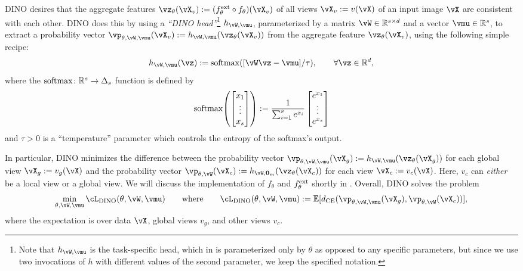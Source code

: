 \documentclass[\toplevelprefix/book-main.tex]{subfiles}
\begin{document}
DINO desires that the aggregate features \(\vz_{\theta}(\vX_{v}) := (f_{\theta}^{\ext} \circ f_{\theta})(\vX_{v})\) of all views \(\vX_{v} := v(\vX)\) of an input image \(\vX\) are consistent with each other. DINO does this by using a \textit{``DINO head''}\footnote{Note that \(h_{\vW, \vmu}\) is the task-specific head, which in  is parameterized only by \(\theta\) as opposed to any specific parameters, but since we use two invocations of \(h\) with different values of the second parameter, we keep the specified notation.} \(h_{\vW, \vmu}\), parameterized by a matrix \(\vW \in \R^{s \times d}\) and a vector \(\vmu \in \R^{s}\), to extract a probability vector \(\vp_{\theta, \vW, \vmu}(\vX_{v}) := h_{\vW, \vmu}(\vz_{\theta}(\vX_{v}))\) from the aggregate feature \(\vz_{\theta}(\vX_{v})\), using the following simple recipe:
\begin{equation}
    h_{\vW, \vmu}(\vz) := \softmax([\vW\vz - \vmu]/\tau), \qquad \forall \vz \in \R^{d},
\end{equation}
where the \(\operatorname{\mathrm{softmax}} \colon \mathbb{R}^{s} \to \Delta_{s}\) function is defined by 
\begin{equation}
    \softmax\rp{\mat{x_{1} \\ \vdots \\ x_{s}}} := \frac{1}{\sum_{i = 1}^{s}e^{x_{i}}}\mat{e^{x_{1}} \\ \vdots \\ e^{x_{s}}}
\end{equation}
and \(\tau > 0\) is a ``temperature'' parameter which controls the entropy of the softmax's output.

In particular, DINO minimizes the difference between the probability vector \(\vp_{\theta, \vW, \vmu}(\vX_{g}) := h_{\vW, \vmu}(\vz_{\theta}(\vX_{g}))\) for each global view \(\vX_{g} := v_{g}(\vX)\) and the probability vector \(\vp_{\theta, \vW}(\vX_{c}) := h_{\vW, \vzero_{m}}(\vz_{\theta}(\vX_{c}))\) for each view \(\vX_{c} := v_{c}(\vX)\). Here, \(v_{c}\) can \textit{either} be a local view or a global view. We will discuss the implementation of \(f_{\theta}\) and \(f_{\theta}^{\mathrm{ext}}\) shortly in . Overall, DINO solves the problem
 \begin{equation}\label{eq:dino_loss}
     \min_{\theta, \vW, \vmu}\cL_{\dino}(\theta, \vW, \vmu) \qquad \text{where} \qquad \cL_{\dino}(\theta, \vW, \vmu) := \Ex[d_{\CE}(\vp_{\theta, \vW, \vmu}(\vX_{g}), \vp_{\theta, \vW}(\vX_{c}))],
\end{equation}
where the expectation is over data \(\vX\), global views \(v_{g}\), and other views \(v_{c}\).
\end{document}
